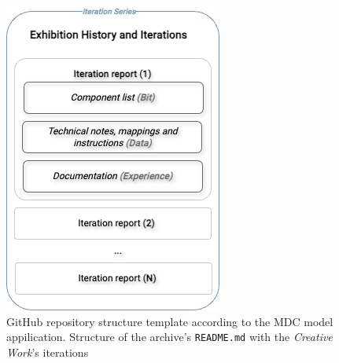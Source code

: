 \begin{figure}[!h]
    \centering
    \includegraphics[width=0.4\linewidth]{chapters/4-MDC_model_application/image/graph04-githubtemplate02.png}
    \caption{GitHub repository structure template according to the MDC model appilication. Structure of the archive's \texttt{README.md} with the \textit{Creative Work}'s iterations}
    \label{fig:c4-github-template02}
\end{figure}

